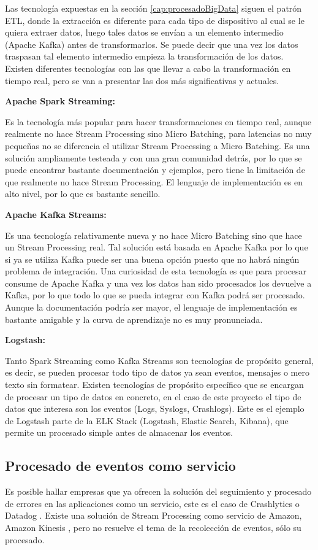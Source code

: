 Las tecnología expuestas en la sección \ref{cap:procesadoBigData} siguen el patrón ETL, donde la extracción es diferente para cada tipo de dispositivo al cual se le quiera extraer datos, luego tales datos se envían a un elemento intermedio (Apache Kafka) antes de transformarlos. Se puede decir que una vez los datos traspasan tal elemento intermedio empieza la transformación de los datos. Existen diferentes tecnologías con las que llevar a cabo la transformación en tiempo real, pero se van a presentar las dos más significativas y actuales.


\textbf{Apache Spark Streaming:}

Es la tecnología más popular para hacer transformaciones en tiempo real, aunque realmente no hace Stream Processing sino Micro Batching, para latencias no muy pequeñas no se diferencia el utilizar Stream Processing a Micro Batching. Es una solución ampliamente testeada y con una gran comunidad detrás, por lo que se puede encontrar bastante documentación y ejemplos, pero tiene la limitación de que realmente no hace Stream Processing. El lenguaje de implementación es en alto nivel, por lo que es bastante sencillo.

\textbf{Apache Kafka Streams:}

Es una tecnología relativamente nueva y no hace Micro Batching sino que hace un Stream Processing real. Tal solución está basada en Apache Kafka por lo que si ya se utiliza Kafka puede ser una buena opción puesto que no habrá ningún problema de integración. Una curiosidad de esta tecnología es que para procesar consume de Apache Kafka y una vez los datos han sido procesados los devuelve a Kafka, por lo que todo lo que se pueda integrar con Kafka podrá ser procesado. Aunque la documentación podría ser mayor, el lenguaje de implementación es bastante amigable y la curva de aprendizaje no es muy pronunciada.

\textbf{Logstash:}

Tanto Spark Streaming como Kafka Streams son tecnologías de propósito general, es decir, se pueden procesar todo tipo de datos ya sean eventos, mensajes o mero texto sin formatear. Existen tecnologías de propósito específico que se encargan de procesar un tipo de datos en concreto, en el caso de este proyecto el tipo de datos que interesa son los eventos (Logs, Syslogs, Crashlogs). Este es el ejemplo de Logstash parte de la ELK Stack (Logstash, Elastic Search, Kibana), que permite un procesado simple antes de almacenar los eventos.


\subsection{Procesado de eventos como servicio}
Es posible hallar empresas que ya ofrecen la solución del seguimiento y procesado de errores en las aplicaciones como un servicio, este es el caso de Crashlytics \cite{Tfg:crashlytics} o Datadog \cite{Tfg:datadog}. Existe una solución de Stream Processing como servicio de Amazon, Amazon Kinesis \cite{Tfg:kinesis}, pero no resuelve el tema de la recolección de eventos, sólo su procesado.



